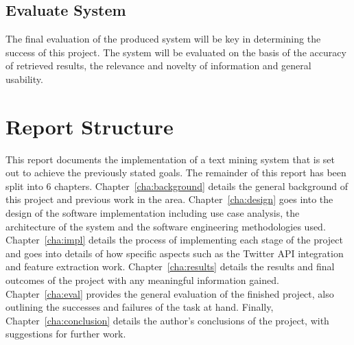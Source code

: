 \subsection{Evaluate System}
The final evaluation of the produced system will be key in determining the success of this project. The system will be evaluated on the basis of the accuracy of retrieved results, the relevance and novelty of information and general usability.

\section{Report Structure}
This report documents the implementation of a text mining system that is set out to achieve the previously stated goals. The remainder of this report has been split into 6 chapters.
Chapter~\ref{cha:background} details the general background of this project and previous work in the area.
Chapter~\ref{cha:design} goes into the design of the software implementation including use case analysis, the architecture of the system and the software engineering methodologies used.
Chapter~\ref{cha:impl} details the process of implementing each stage of the project and goes into details of how specific aspects such as the Twitter API integration and feature extraction work.
Chapter~\ref{cha:results} details the results and final outcomes of the project with any meaningful information gained.
Chapter~\ref{cha:eval} provides the general evaluation of the finished project, also outlining the successes and failures of the task at hand.
Finally, Chapter~\ref{cha:conclusion} details the author's conclusions of the project, with suggestions for further work.
